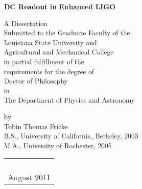 \thispagestyle{empty}
\begin{center}
\textbf{DC Readout in Enhanced LIGO}
\vspace{1.75in}

A Dissertation\\
\vspace{1ex}
Submitted to the Graduate Faculty of the\\
Louisiana State University and\\
Agricultural and Mechanical College\\
in partial fulfillment of the\\
requirements for the degree of\\
Doctor of Philosophy\\
\vspace{1ex}
in\\
\vspace{1ex}
The Department of Physics and Astronomy\\
\vspace{1in}
\texttt{\color{red}{DRAFT compiled \today}}
\vspace{0.75in}

by\\
Tobin Thomas Fricke \\
B.S., University of California, Berkeley, 2003\\
M.A., University of Rochester, 2005 \\

\begin{tabular}{c}
\\
\\
\\
\\
\\
August 2011
\end{tabular}

\end{center}

